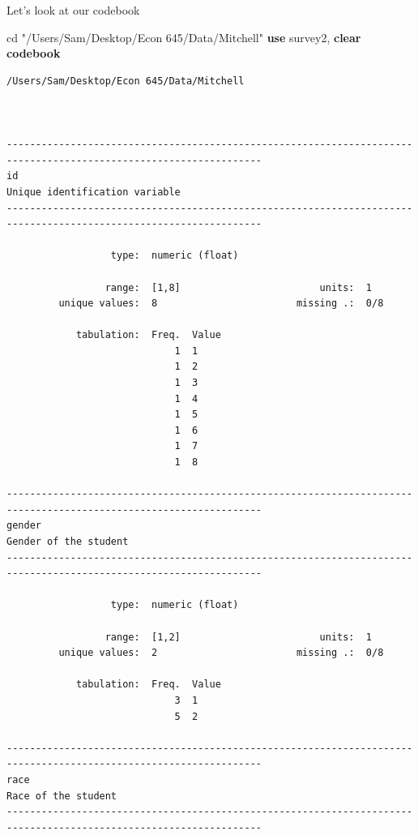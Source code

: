 \documentclass[
]{book}
\newenvironment{Shaded}{\begin{snugshade}}{\end{snugshade}}
\newcommand{\KeywordTok}[1]{\textcolor[rgb]{0.13,0.29,0.53}{\textbf{#1}}}
\newcommand{\NormalTok}[1]{#1}
\newcommand{\StringTok}[1]{\textcolor[rgb]{0.31,0.60,0.02}{#1}}
\begin{document}
Let's look at our codebook

\begin{Shaded}
\begin{Highlighting}[]
\NormalTok{cd }\StringTok{"/Users/Sam/Desktop/Econ 645/Data/Mitchell"}
\KeywordTok{use}\NormalTok{ survey2, }\KeywordTok{clear}
\KeywordTok{codebook} 
\end{Highlighting}
\end{Shaded}

\begin{verbatim}
/Users/Sam/Desktop/Econ 645/Data/Mitchell



------------------------------------------------------------------------------------------------------------------
id                                                                                  Unique identification variable
------------------------------------------------------------------------------------------------------------------

                  type:  numeric (float)

                 range:  [1,8]                        units:  1
         unique values:  8                        missing .:  0/8

            tabulation:  Freq.  Value
                             1  1
                             1  2
                             1  3
                             1  4
                             1  5
                             1  6
                             1  7
                             1  8

------------------------------------------------------------------------------------------------------------------
gender                                                                                       Gender of the student
------------------------------------------------------------------------------------------------------------------

                  type:  numeric (float)

                 range:  [1,2]                        units:  1
         unique values:  2                        missing .:  0/8

            tabulation:  Freq.  Value
                             3  1
                             5  2

------------------------------------------------------------------------------------------------------------------
race                                                                                           Race of the student
------------------------------------------------------------------------------------------------------------------


\end{verbatim}
\end{document}
